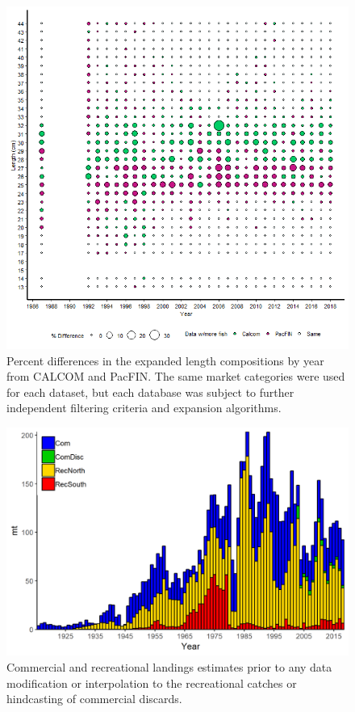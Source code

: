 \documentclass[12pt,]{article}
\begin{document}
\begin{figure}
\centering
\includegraphics{Figures/Calcom_vs_pacfin_lengths.png}
\caption{Percent differences in the expanded length compositions by year
from CALCOM and PacFIN. The same market categories were used for each
dataset, but each database was subject to further independent filtering
criteria and expansion algorithms. \label{fig:Calcom_vs_pacfin_lengths}}
\end{figure}

\begin{figure}
\centering
\includegraphics{Figures/Catches_original.png}
\caption{Commercial and recreational landings estimates prior to any
data modification or interpolation to the recreational catches or
hindcasting of commercial discards. \label{fig:Catches_original}}
\end{figure}
\end{document}

